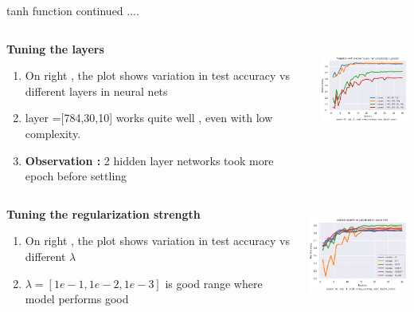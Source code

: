 \documentclass[12pt,t]{beamer}
\begin{document}
\begin{frame}[t]
    \large tanh function continued ....
    \scriptsize



    \begin{columns}
        \begin{column}[T]{0.4\linewidth}
            \textbf{Tuning the layers}
                \begin{enumerate}
                    \item On right , the plot shows variation in test accuracy vs different layers in neural nets
                    \item layer =[784,30,10] works quite well , even with low complexity.
                    \item \textbf{Observation :} 2 hidden layer  networks took more epoch before settling 
                \end{enumerate}
        \end{column}
        \begin{column}[T]{0.6\linewidth}
            \includegraphics[width=\linewidth,height=90pt]{tanh/variation_layers.png}
        \end{column}
    \end{columns}
    \begin{columns}
        \begin{column}[T]{0.4\linewidth}
            \textbf{Tuning the regularization strength}
                \begin{enumerate}
                    \item On right , the plot shows variation in test accuracy vs different $\lambda$
                    \item $\lambda = [1e-1,1e-2,1e-3] $ is good range where model performs good   
                \end{enumerate}
        \end{column}
        \begin{column}[T]{0.6\linewidth}
            \includegraphics[width=\linewidth,height=90pt]{tanh/variation_lambda.png}
        \end{column}
    \end{columns}


    

    

\end{frame}
\end{document}
